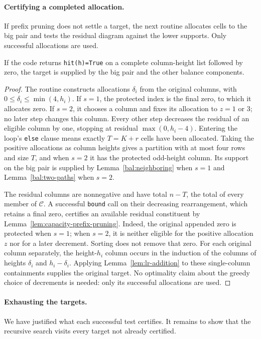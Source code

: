 \paragraph{Certifying a completed allocation.}
If prefix pruning does not settle a target, the next routine allocates
cells to the big pair and tests the residual diagram against the lower
supports. Only successful allocations are used.

\begin{lemma}
\label{lem:capacity-hit}
If the code returns \texttt{hit(h)=True} on a complete column-height
list followed by zero, the target is supplied by the big pair and
the other balance components.
\end{lemma}

\begin{proof}
The routine constructs allocations $\delta_i$ from the original
columns, with $0\le\delta_i\le\min(4,h_i)$. If $s=1$, the protected
index is the final zero, to which it allocates zero. If $s=2$, it
chooses a column and fixes its allocation to $z=1$ or $3$; no later
step changes this column. Every other step decreases the residual
of an eligible column by one, stopping at residual
$\max(0,h_i-4)$. Entering the loop's \texttt{else} clause means
exactly $T=K+r$ cells have been allocated. Taking the positive
allocations as column heights gives a partition with at most four rows
and size $T$,
and when $s=2$ it has the protected odd-height column.
Its support on the big pair is supplied
by Lemma~\ref{bal:neighboring} when $s=1$ and
Lemma~\ref{bal:two-paths} when $s=2$.

The residual columns are nonnegative and have total $n-T$, the
total of every member of $\mathcal C$. A successful \texttt{bound}
call on their decreasing rearrangement, which retains a final zero,
certifies an available residual constituent by
Lemma~\ref{lem:capacity-prefix-pruning}. Indeed, the original appended
zero is protected when $s=1$; when $s=2$, it is neither eligible for
the positive allocation $z$ nor for a later decrement. Sorting does
not remove that zero. For each original column separately,
the height-$h_i$ column occurs in the induction of the columns of
heights $\delta_i$ and $h_i-\delta_i$. Applying
Lemma~\ref{lem:lr-addition} to these single-column containments
supplies the original target. No optimality claim about the greedy
choice of decrements is needed: only its successful allocations are
used.
\end{proof}

\paragraph{Exhausting the targets.}
We have justified what each successful test certifies. It remains to
show that the recursive search visits every target not already certified.

